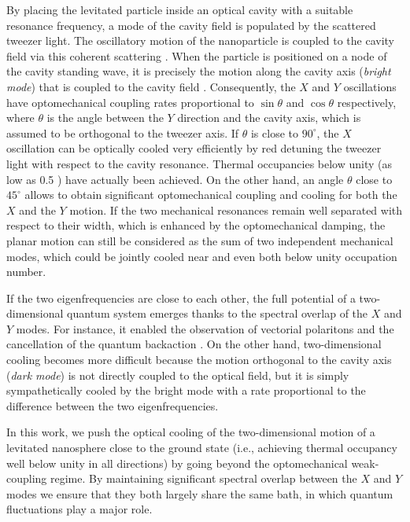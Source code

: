 \documentclass[11pt,floatfix,amssymb,prx,aps,longbibliography,superscriptaddress,nopacs]{revtex4-2}
\begin{document}
By placing the levitated particle inside an optical cavity with a suitable resonance frequency, a mode of the cavity field is populated by the scattered tweezer light. The oscillatory motion of the nanoparticle is coupled to the cavity field via this coherent scattering \cite{Vuletic2000,Windey2019,Delic2019A,Quidant2020}. When the particle is positioned on a node of the cavity standing wave, it is precisely the motion along the cavity axis ({\it bright mode}) that is coupled to the cavity field \cite{Toros2020B,Toros2021,Borkje2023}. Consequently, the $X$ and $Y$ oscillations have optomechanical coupling rates proportional to $\sin \theta$ and $\cos \theta$ respectively, where $\theta$ is the angle between the $Y$ direction and the cavity axis, which is assumed to be orthogonal to the tweezer axis. If $\theta$ is close to $90^{\circ}$, the $X$ oscillation can be optically cooled very efficiently by red detuning the tweezer light with respect to the cavity resonance. Thermal occupancies below unity \cite{Delic2020} (as low as 0.5 \cite{Ranfagni2022,Piotrowski2023}) have actually been achieved. On the other hand, an angle $\theta$ close to $45^{\circ}$ allows to obtain significant optomechanical coupling and cooling for both the $X$ and the $Y$ motion. If the two mechanical resonances remain well separated with respect to their width, which is enhanced by the optomechanical damping, the planar motion can still be considered as the sum of two independent mechanical modes, which could be jointly cooled near \cite{Ranfagni2022} and even both below \cite{Piotrowski2023} unity occupation number. 

If the two eigenfrequencies are close to each other, the full potential of a two-dimensional quantum system emerges thanks to the spectral overlap of the $X$ and $Y$ modes. For instance, it enabled the observation of vectorial polaritons \cite{Ranfagni2021} and the cancellation of the quantum backaction \cite{Ranfagni2023}. On the other hand, two-dimensional cooling becomes more difficult because the motion orthogonal to the cavity axis ({\it dark mode}) is not directly coupled to the optical field, but it is simply sympathetically cooled by the bright mode \cite{Toros2021} with a rate proportional to the difference between the two eigenfrequencies.   

In this work, we push the optical cooling of the two-dimensional motion of a levitated nanosphere close to the ground state (i.e., achieving thermal occupancy well below unity in all directions) by going beyond the optomechanical weak-coupling regime. By maintaining significant spectral overlap between the $X$ and $Y$ modes we ensure that they both largely share the same bath, in which quantum fluctuations play a major role. 
\end{document}
